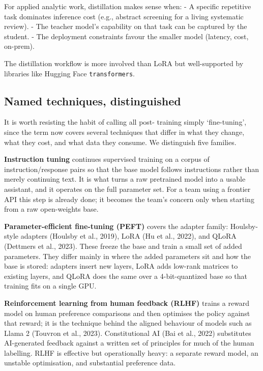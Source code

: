 \documentclass[
  letterpaper,
  11pt]{scrbook}
\begin{document}
For applied analytic work, distillation makes sense when: - A specific
repetitive task dominates inference cost (e.g., abstract screening for a
living systematic review). - The teacher model's capability on that task
can be captured by the student. - The deployment constraints favour the
smaller model (latency, cost, on-prem).

The distillation workflow is more involved than LoRA but well-supported
by libraries like Hugging Face \texttt{transformers}.

\subsection{Named techniques,
distinguished}\label{named-techniques-distinguished}

It is worth resisting the habit of calling all post- training simply
`fine-tuning', since the term now covers several techniques that differ
in what they change, what they cost, and what data they consume. We
distinguish five families.

\textbf{Instruction tuning} continues supervised training on a corpus of
instruction/response pairs so that the base model follows instructions
rather than merely continuing text. It is what turns a raw pretrained
model into a usable assistant, and it operates on the full parameter
set. For a team using a frontier API this step is already done; it
becomes the team's concern only when starting from a raw open-weights
base.

\textbf{Parameter-efficient fine-tuning (PEFT)} covers the adapter
family: Houlsby-style adapters (Houlsby et al., 2019), LoRA (Hu et al.,
2022), and QLoRA (Dettmers et al., 2023). These freeze the base and
train a small set of added parameters. They differ mainly in where the
added parameters sit and how the base is stored: adapters insert new
layers, LoRA adds low-rank matrices to existing layers, and QLoRA does
the same over a 4-bit-quantized base so that training fits on a single
GPU.

\textbf{Reinforcement learning from human feedback (RLHF)} trains a
reward model on human preference comparisons and then optimises the
policy against that reward; it is the technique behind the aligned
behaviour of models such as Llama 2 ({Touvron et al.}, 2023).
Constitutional AI ({Bai et al.}, 2022) substitutes AI-generated feedback
against a written set of principles for much of the human labelling.
RLHF is effective but operationally heavy: a separate reward model, an
unstable optimisation, and substantial preference data.
\end{document}
